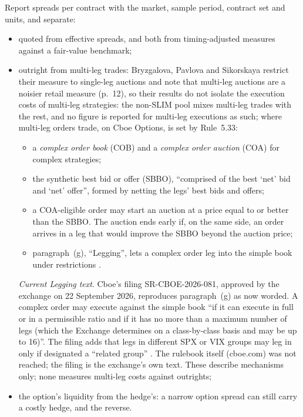 \begin{qfmethod}
 Report spreads per contract with the market, sample period, contract set and units, and separate:
\begin{itemize}
\item quoted from effective spreads, and both from timing-adjusted measures against a fair-value benchmark;
\item outright from multi-leg trades: Bryzgalova, Pavlova and Sikorskaya restrict their measure to single-leg auctions and note that multi-leg auctions are a noisier retail measure (p.~12), so their results do not isolate the execution costs of multi-leg strategies: the non-SLIM pool mixes multi-leg trades with the rest, and no figure is reported for multi-leg executions as such; where multi-leg orders trade, on Cboe Options, is set by Rule~5.33:
\begin{itemize}
\item a \emph{complex order book} (COB) and a \emph{complex order auction} (COA) for complex strategies;
\item the synthetic best bid or offer (SBBO), ``comprised of the best `net' bid and `net' offer'', formed by netting the legs' best bids and offers;
\item a COA-eligible order may start an auction at a price equal to or better than the SBBO. The auction ends early if, on the same side, an order arrives in a leg that would improve the SBBO beyond the auction price;
\item paragraph~(g), ``Legging'', lets a complex order leg into the simple book under restrictions \citep[Release 34-92729, 23 August 2021, public-inspection PDF pp.~3--5 and~10--11]{fr-cboe-5-33-2021}.
\end{itemize}
\emph{Current Legging text}. Cboe's filing SR-CBOE-2026-081, approved by the exchange on 22 September 2026, reproduces paragraph~(g) as now worded. A complex order may execute against the simple book ``if it can execute in full or in a permissible ratio and if it has no more than a maximum number of legs (which the Exchange determines on a class-by-class basis and may be up to 16)''. The filing adds that legs in different SPX or VIX groups may leg in only if designated a ``related group'' \citep[Item~2, p.~3; Exhibit~5, Rule 5.33(g) and (g)(6), p.~25]{cboe-sr-2026-081}. The rulebook itself (cboe.com) was not reached; the filing is the exchange's own text. These describe mechanisms only; none measures multi-leg costs against outrights;
\item the option's liquidity from the hedge's: a narrow option spread can still carry a costly hedge, and the reverse.
\end{itemize}


\end{qfmethod}
